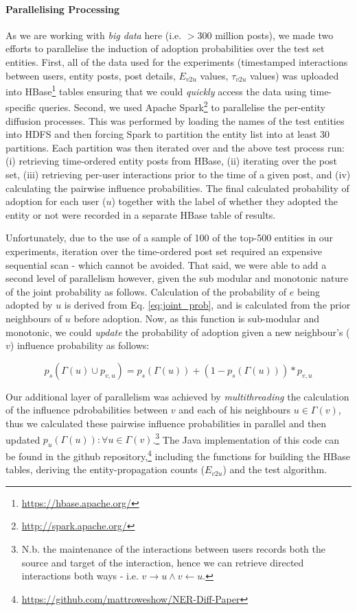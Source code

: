 \documentclass[review]{elsarticle}
\begin{document}
\paragraph{Parallelising Processing}
As we are working with \emph{big data} here (i.e. $>300$ million posts), we made two efforts to parallelise the induction of adoption probabilities over the test set entities.
First, all of the data used for the experiments (timestamped interactions between users, entity posts, post details, $E_{v2u}$ values, $\tau_{v2u}$ values) was uploaded into HBase\footnote{\url{https://hbase.apache.org/}} tables ensuring that we could \emph{quickly} access the data using time-specific queries.
Second, we used Apache Spark\footnote{\url{http://spark.apache.org/}} to parallelise the per-entity diffusion processes.
This was performed by loading the names of the test entities into HDFS and then forcing Spark to partition the entity list into at least 30 partitions.
Each partition was then iterated over and the above test process run: (i) retrieving time-ordered entity posts from HBase, (ii) iterating over the post set, (iii) retrieving per-user interactions prior to the time of a given post, and (iv) calculating the pairwise influence probabilities.
The final calculated probability of adoption for each user ($u$) together with the label of whether they adopted the entity or not were recorded in a separate HBase table of results.

Unfortunately, due to the use of a sample of 100 of the top-500 entities in our experiments, iteration over the time-ordered post set required an expensive sequential scan - which cannot be avoided.
That said, we were able to add a second level of parallelism however, given the sub modular and monotonic nature of the joint probability as follows.
Calculation of the probability of $e$ being adopted by $u$ is derived from Eq. \ref{eq:joint_prob}, and is calculated from the prior neighbours of $u$ before adoption.
Now, as this function is sub-modular and monotonic, we could \emph{update} the probability of adoption given a new neighbour's ($v$) influence probability as follows:

\begin{equation}
p_s(\Gamma(u) \cup p_{v,u}) = p_s(\Gamma(u)) + (1 - p_s(\Gamma(u))) * p_{v,u}
\end{equation}

Our additional layer of parallelism was achieved by \emph{multithreading} the calculation of the influence pdrobabilities between $v$ and each of his neighbours $u \in \Gamma(v)$, thus we calculated these pairwise influence probabilities in parallel and then updated $p_u(\Gamma(u)) : \forall u \in \Gamma(v)$.\footnote{N.b. the maintenance of the interactions between users records both the source and target of the interaction, hence we can retrieve directed interactions both ways - i.e. $v \rightarrow u \wedge v \leftarrow u$.}
The Java implementation of this code can be found in the github repository,\footnote{\url{https://github.com/mattroweshow/NER-Diff-Paper}} including the functions for building the HBase tables, deriving the entity-propagation counts ($E_{v2u}$) and the test algorithm.
\end{document}
